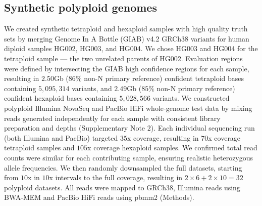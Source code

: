 \documentclass[notitlepage, twocolumn, 10pt]{article}
\begin{document}
%
%

\subsection*{Synthetic polyploid genomes} We created synthetic tetraploid and hexaploid samples with high quality truth sets by merging Genome In A Bottle (GIAB) v4.2 GRCh38 variants for human diploid samples HG002, HG003, and HG004. We chose HG003 and HG004 for the tetraploid sample --- the two unrelated parents of HG002. Evaluation regions were defined by intersecting the GIAB high confidence regions for each sample, resulting in $2.50$Gb ($86\%$ non-N primary reference) confident tetraploid bases containing $5,095,314 $ variants, and $2.49$Gb ($85\%$ non-N primary reference) confident hexaploid bases containing $5,028,566$ variants. We constructed polyploid Illumina NovaSeq and PacBio HiFi whole-genome test data by mixing reads generated independently for each sample with consistent library preparation and depths (Supplementary Note $2$). Each individual sequencing run (both Illumina and PacBio) targeted $35$x coverage, resulting in $70$x coverage tetraploid samples and $105$x coverage hexaploid samples. We confirmed total read counts were similar for each contributing sample, ensuring realistic heterozygous allele frequencies. We then randomly downsampled the full datasets, starting from $10$x in $10$x intervals to the full coverage, resulting in $2 \times 6 + 2 \times 10 = 32$ polyploid datasets. All reads were mapped to GRCh38, Illumina reads using BWA-MEM and PacBio HiFi reads using pbmm2 (Methods).
\end{document}
